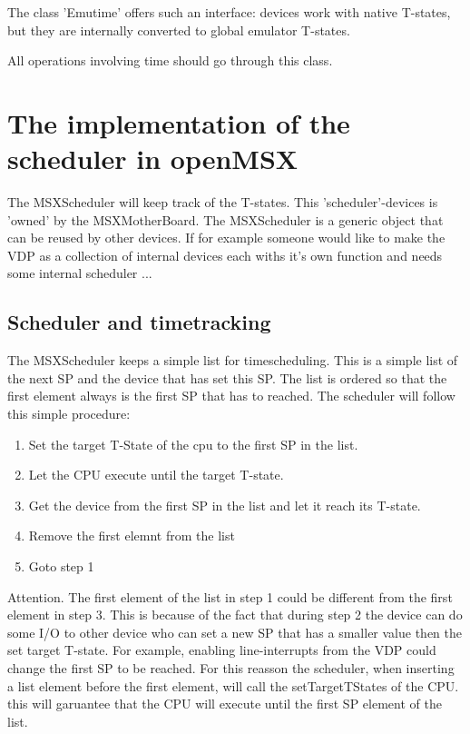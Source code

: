 \documentclass[11pt, a4paper]{report}
\begin{document}
The class 'Emutime' offers such an interface: devices work with native T-states,
but they are internally converted to global emulator T-states.

All operations involving time should go through this class.


\section{The implementation of the scheduler in openMSX}

The MSXScheduler will keep track of the T-states. This 'scheduler'-devices
is 'owned' by the MSXMotherBoard. The MSXScheduler is a generic object
that can be reused by other devices. If for example someone would like to
make the VDP as a collection of internal devices each withs it's own
function and needs some internal scheduler ...

\subsection{Scheduler and timetracking}

The MSXScheduler keeps a simple list for timescheduling. This is a simple
list of the next SP and the device that has set this SP. The list is
ordered so that the first element always is the first SP that has to
reached.  The scheduler will follow this simple procedure:
\begin{enumerate}
\item Set the target T-State of the cpu to the first SP in the list.
\item Let the CPU execute until the target T-state.
\item Get the device from the first SP in the list and let it reach its
T-state.
\item Remove the first elemnt from the list
\item Goto step 1
\end{enumerate}

Attention. The first element of the list in step 1 could be different from
the first element in step 3. This is because of the fact that during step
2 the device can do some I/O to other device who can set a new SP that has
a smaller value then the set target T-state. For example, enabling
line-interrupts from the VDP could change the first SP to be reached.  For
this reasson the scheduler, when inserting a list element before the first
element, will call the setTargetTStates of the CPU. this will garuantee
that the CPU will execute until the first SP element of the list.
\end{document}
